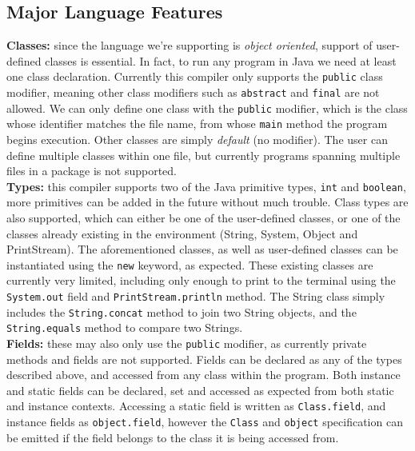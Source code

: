 \documentclass[a4paper, 11pt]{article}
\begin{document}
\subsection{Major Language Features}
\textbf{Classes:} since the language we're supporting is \textit{object oriented}, support of user-defined classes is essential. In fact, to run any program in Java we need at least one class declaration. Currently this compiler only supports the \texttt{public} class modifier, meaning other class modifiers such as \texttt{abstract} and \texttt{final} are not allowed. We can only define one class with the \texttt{public} modifier, which is the class whose identifier matches the file name, from whose \texttt{main} method the program begins execution. Other classes are simply \textit{default} (no modifier). The user can define multiple classes within one file, but currently programs spanning multiple files in a package is not supported.
\\\newline
\textbf{Types:} this compiler supports two of the Java primitive types, \texttt{int} and \texttt{boolean}, more primitives can be added in the future without much trouble. Class types are also supported, which can either be one of the user-defined classes, or one of the classes already existing in the environment (String, System, Object and PrintStream). The aforementioned classes, as well as user-defined classes can be instantiated using the \texttt{new} keyword, as expected. These existing classes are currently very limited, including only enough to print to the terminal using the \texttt{System.out} field and \texttt{PrintStream.println} method. The String class simply includes the \texttt{String.concat} method to join two String objects, and the \texttt{String.equals} method to compare two Strings.
\\\newline
\textbf{Fields:} these may also only use the \texttt{public} modifier, as currently private methods and fields are not supported. Fields can be declared as any of the types described above, and accessed from any class within the program. Both instance and static fields can be declared, set and accessed as expected from both static and instance contexts. Accessing a static field is written as \texttt{Class.field}, and instance fields as \texttt{object.field}, however the \texttt{Class} and \texttt{object} specification can be emitted if the field belongs to the class it is being accessed from.
\\\newline
\end{document}
